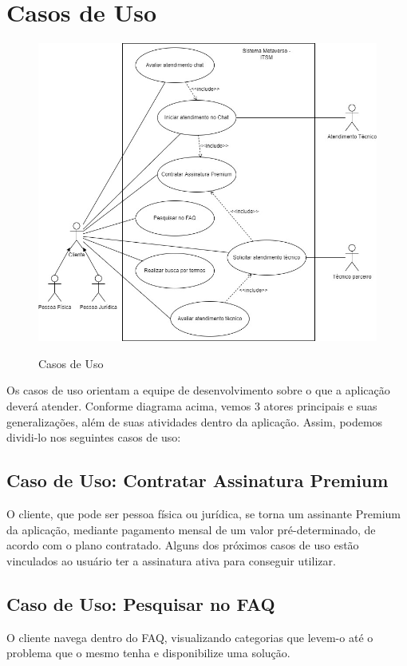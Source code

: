 \documentclass[
    12pt,               %
    openright,          %
    oneside,
    a4paper,            %
    MODELO,             %
    english,            %
    brazil              %
   ]{ifsp-spo-inf-ctds}
\begin{document}
\section{Casos de Uso}
\begin{figure}[h]
\caption{Casos de Uso}

\centering %
\includegraphics[width=15cm]{anexos/Casos de Uso.jpeg} %
\label{figura:casosdeuso}
\end{figure}

Os casos de uso orientam a equipe de desenvolvimento sobre o que a aplicação deverá atender. Conforme diagrama acima, vemos 3 atores principais e suas generalizações, além de suas atividades dentro da aplicação. Assim, podemos dividi-lo nos seguintes casos de uso:

\subsection{Caso de Uso: Contratar Assinatura Premium}
O cliente, que pode ser pessoa física ou jurídica, se torna um assinante Premium da aplicação, mediante pagamento mensal de um valor pré-determinado, de acordo com o plano contratado. Alguns dos próximos casos de uso estão vinculados ao usuário ter a assinatura ativa para conseguir utilizar.

\subsection{Caso de Uso: Pesquisar no FAQ}
O cliente navega dentro do FAQ, visualizando categorias que levem-o até o problema que o mesmo tenha e disponibilize uma solução.
\end{document}
